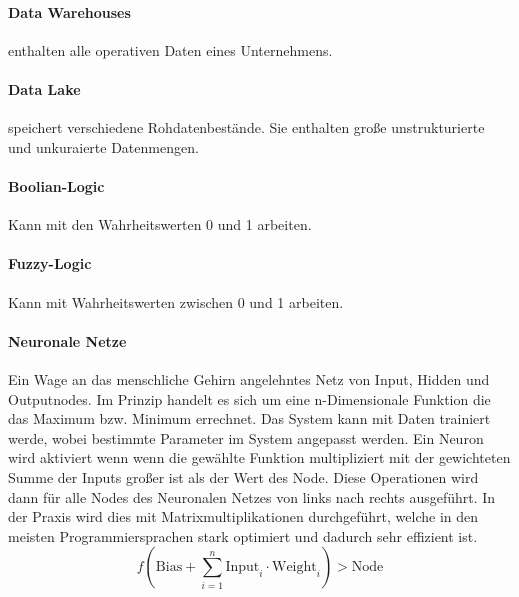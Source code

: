 \documentclass[twocolumn]{article}
\begin{document}
\paragraph{Data Warehouses} enthalten alle operativen Daten eines Unternehmens.

\paragraph{Data Lake} speichert verschiedene Rohdatenbestände. Sie enthalten große unstrukturierte und unkuraierte Datenmengen.
\paragraph{Boolian-Logic}
	Kann mit den Wahrheitswerten 0 und 1 arbeiten.

\paragraph{Fuzzy-Logic}
	Kann mit Wahrheitswerten zwischen 0 und 1 arbeiten.

\paragraph{Neuronale Netze}
Ein Wage an das menschliche Gehirn angelehntes Netz von Input, Hidden und Outputnodes. Im Prinzip handelt es sich um eine n-Dimensionale Funktion die das Maximum bzw. Minimum errechnet. Das System kann mit Daten trainiert werde, wobei bestimmte Parameter im System angepasst werden. Ein Neuron wird aktiviert wenn wenn die gewählte Funktion multipliziert mit der gewichteten Summe der Inputs großer ist als der Wert des Node. Diese Operationen wird dann für alle Nodes des Neuronalen Netzes von links nach rechts ausgeführt. In der Praxis wird dies mit Matrixmultiplikationen durchgeführt, welche in den meisten Programmiersprachen stark optimiert und dadurch sehr effizient ist.
\begin{equation*}
f \left(\text{Bias} + \sum_{i=1}^{n} \text{Input}_i \cdot \text{Weight}_i \right) > \text{Node}
	\end{equation*}
	
\end{document}
